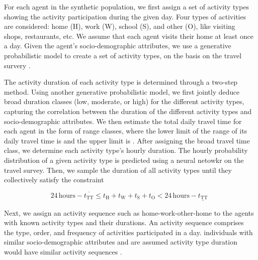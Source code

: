 \documentclass[../main.tex]{subfiles}
\begin{document}
For each agent in the synthetic population, we first assign a set of activity types showing the activity participation during the given day. Four types of activities are considered: home (H), work (W), school (S), and other (O), like visiting shops, restaurants, etc. We assume that each agent visits their home at least once a day. Given the agent's socio-demographic attributes, we use a generative probabilistic model to create a set of activity types, on the basis on the travel survery \citep{Jafari2022BuildingModels}. 




The activity duration of each activity type is determined through a two-step method. Using another generative probabilistic model, we first jointly deduce broad duration classes (low, moderate, or high) for the different activity types, capturing the correlation between the duration of the different activity types and socio-demographic attributes. We then estimate the total daily travel time for each agent in the form of range classes, 
 where the lower limit of the range of its daily travel time is 
 and the upper limit is 
. After assigning the broad travel time class, we determine each activity type's hourly duration. The hourly probability distribution of a given activity type is predicted using a neural netowkr on the travel survey. Then, we sample the duration of all activity types until they collectively satisfy the constraint 

\[
24 \, \text{hours} - \overline{t_{\text{TT}}} \leq t_{\text{H}} + t_{\text{W}} + t_{\text{S}} + t_{\text{O}} < 24 \, \text{hours} - \underline{t_{\text{TT}}}
\]


Next, we assign an activity sequence such as home-work-other-home to the agents with known activity types and their durations. An activity sequence comprises the type, order, and frequency of activities participated in a day. individuals with similar socio-demographic attributes and are assumed activity type duration would have similar activity sequences \citep{Lum2016AMatching}. 
\end{document}
